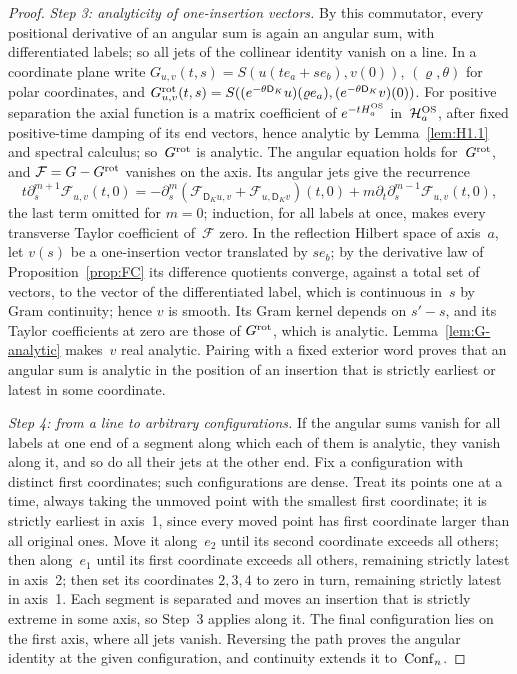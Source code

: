 \begin{proof}
\emph{Step 3: analyticity of one-insertion vectors.} By this commutator, every positional derivative of an angular sum is again an angular sum, with differentiated labels; so all jets of the collinear identity vanish on a line. In a coordinate plane write $G_{u,v}(t,s)=S(u(te_a+se_b),v(0))$, $(\varrho,\theta)$ for polar coordinates, and $G^{\rm rot}_{u,v}(t,s)=S((e^{-\theta \mathsf D_K}u)(\varrho e_a),(e^{-\theta \mathsf D_K}v)(0))$. For positive separation the axial function is a matrix coefficient of $e^{-tH_a^{\rm OS}}$ in~$\mathcal H_a^{\rm OS}$, after fixed positive-time damping of its end vectors, hence analytic by Lemma~\ref{lem:H1.1} and spectral calculus; so~$G^{\rm rot}$ is analytic. The angular equation holds for~$G^{\rm rot}$, and $\mathcal F=G-G^{\rm rot}$ vanishes on the axis. Its angular jets give the recurrence
\begin{equation*}
t\partial_s^{m+1}\mathcal F_{u,v}(t,0)
=-\partial_s^m(\mathcal F_{\mathsf D_Ku,v}+\mathcal F_{u,\mathsf D_Kv})(t,0)
 +m\partial_t\partial_s^{m-1}\mathcal F_{u,v}(t,0),
\end{equation*}
the last term omitted for $m=0$; induction, for all labels at once, makes every transverse Taylor coefficient of~$\mathcal F$ zero. In the reflection Hilbert space of axis~$a$, let $v(s)$ be a one-insertion vector translated by $se_b$; by the derivative law of Proposition~\ref{prop:FC} its difference quotients converge, against a total set of vectors, to the vector of the differentiated label, which is continuous in~$s$ by Gram continuity; hence $v$ is smooth. Its Gram kernel depends on $s'-s$, and its Taylor coefficients at zero are those of $G^{\rm rot}$, which is analytic. Lemma~\ref{lem:G-analytic} makes~$v$ real analytic. Pairing with a fixed exterior word proves that an angular sum is analytic in the position of an insertion that is strictly earliest or latest in some coordinate.

\emph{Step 4: from a line to arbitrary configurations.} If the angular sums vanish for all labels at one end of a segment along which each of them is analytic, they vanish along it, and so do all their jets at the other end. Fix a configuration with distinct first coordinates; such configurations are dense. Treat its points one at a time, always taking the unmoved point with the smallest first coordinate; it is strictly earliest in axis~1, since every moved point has first coordinate larger than all original ones. Move it along~$e_2$ until its second coordinate exceeds all others; then along~$e_1$ until its first coordinate exceeds all others, remaining strictly latest in axis~2; then set its coordinates $2,3,4$ to zero in turn, remaining strictly latest in axis~1. Each segment is separated and moves an insertion that is strictly extreme in some axis, so Step~3 applies along it. The final configuration lies on the first axis, where all jets vanish. Reversing the path proves the angular identity at the given configuration, and continuity extends it to~$\mathrm{Conf}_{n}$.


\end{proof}
